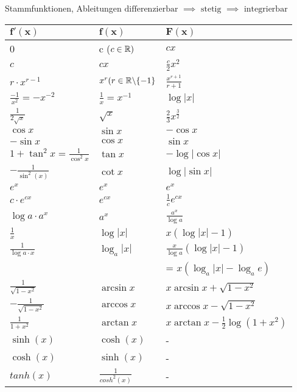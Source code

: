 \begin{Rechenregeln}{Stammfunktionen, Ableitungen}{}
    $\text{differenzierbar }\implies\text{ stetig }\implies \text{ integrierbar}$\\
    \begin{tabular}{l|l|l}
    $\mathbf{f'(x)}$ & $\mathbf{f(x)}$ & $\mathbf{F(x)}$ \\[0.5em] \hline
    0 & c ($c\in\mathbb{R})$ & $cx$ \\[0.5em]
    $c$ & $cx$ &$\frac{c}{2}x^2$ \\[0.5em]
    $r\cdot x^{r-1}$ & $x^r (r\in \mathbb{R} \backslash \{-1\}$ & $\frac{x^{r+1}}{r+1}$ \\[0.5em]
    $\frac{-1}{x^2} = -x^{-2}$ & $\frac{1}{x}=x^{-1}$ & $\log |x| $ \\[0.5em]
    $\frac{1}{2 \sqrt{x}} $ & $\sqrt{x}$ & $\frac{2}{3}x^{\frac{3}{2}}$ \\[0.5em]
    $\cos x$ & $\sin x$  & $-\cos x$ \\[0.5em]
    $-\sin x$ & $\cos x$ & $\sin x$\\[0.5em]
    $1+\tan^2x = \frac{1}{\cos^2x}$ & $\tan x$ & $-\log|\cos x|$\\[0.5em]
    $-\frac{1}{\sin^2(x)}$ & $\cot x$ & $\log|\sin x|$\\[0.5em]
    $e^x$ & $e^x$ & $e^x$\\[0.5em]
    $c\cdot e^{cx}$ & $e^{cx}$ & $\frac{1}{c}e^{cx}$\\[0.5em]
    $\log a \cdot a^x$ & $a^x$ & $\frac{a^x}{\log a}$\\[0.5em]
    $\frac{1}{x}$ & $\log|x|$ & $x(\log|x|-1)$ \\[0.5em]
    $\frac{1}{\log a\cdot x}$ & $\log_a |x|$ & $\frac{x}{\log a}(\log|x|-1)$\\[0.5em]
     & & = $x(\log_a|x|-\log_ae)$\\[0.5em]
    $\frac{1}{\sqrt{1-x^2}}$ & $\arcsin x$ & $x\arcsin x + \sqrt{1-x^2}$\\[0.5em]
    $-\frac{1}{\sqrt{1-x^2}}$ & $\arccos x$ &  $x\arccos x - \sqrt{1-x^2}$\\[0.5em]
    $\frac{1}{1+x^2}$ & $\arctan x$ & $x\arctan x - \frac{1}{2}\log(1+x^2)$\\[0.5em]
    $\sinh(x)$ & $\cosh(x)$ & - \\[0.5em]
    $\cosh(x)$ & $\sinh(x)$ & -\\[0.5em]
    $tanh(x)$ & $\frac{1}{cosh^2(x)}$ & -\\[1em]
    \end{tabular}
\end{Rechenregeln}
